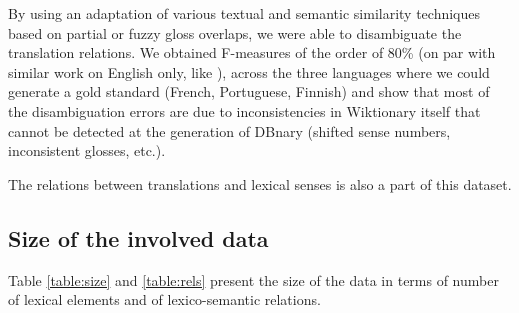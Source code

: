 \documentclass[10pt, a4paper]{article}
\begin{document}
By using an adaptation of various textual and semantic similarity techniques based on partial or fuzzy gloss overlaps, we were able to disambiguate the translation relations. We obtained F-measures of the order of 80\% (on par with similar work on English only, like \cite{meyer-gurevych:2012:PAPERS}), across the three languages where we could generate a gold standard (French, Portuguese, Finnish) and show that most of the disambiguation errors are due to inconsistencies in Wiktionary itself that cannot be detected at the generation of DBnary (shifted sense numbers, inconsistent glosses, etc.).  

The relations between translations and lexical senses is also a part of this dataset.

\subsection{Size of the involved data}

Table \ref{table:size} and \ref{table:rels} present the size of the data in terms of number of lexical elements and of lexico-semantic relations.
\end{document}
